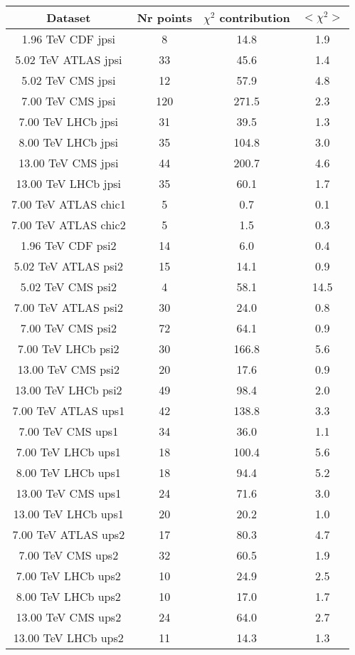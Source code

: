 \begin{table}[h!]
\centering
\begin{tabular}{c|c|c|c}
Dataset & Nr points & $\chi^2$ contribution & $<\chi^2>$ \\
\hline
1.96 TeV CDF jpsi & 8 & 14.8 & 1.9 \\
5.02 TeV ATLAS jpsi & 33 & 45.6 & 1.4 \\
5.02 TeV CMS jpsi & 12 & 57.9 & 4.8 \\
7.00 TeV CMS jpsi & 120 & 271.5 & 2.3 \\
7.00 TeV LHCb jpsi & 31 & 39.5 & 1.3 \\
8.00 TeV LHCb jpsi & 35 & 104.8 & 3.0 \\
13.00 TeV CMS jpsi & 44 & 200.7 & 4.6 \\
13.00 TeV LHCb jpsi & 35 & 60.1 & 1.7 \\
7.00 TeV ATLAS chic1 & 5 & 0.7 & 0.1 \\
7.00 TeV ATLAS chic2 & 5 & 1.5 & 0.3 \\
1.96 TeV CDF psi2 & 14 & 6.0 & 0.4 \\
5.02 TeV ATLAS psi2 & 15 & 14.1 & 0.9 \\
5.02 TeV CMS psi2 & 4 & 58.1 & 14.5 \\
7.00 TeV ATLAS psi2 & 30 & 24.0 & 0.8 \\
7.00 TeV CMS psi2 & 72 & 64.1 & 0.9 \\
7.00 TeV LHCb psi2 & 30 & 166.8 & 5.6 \\
13.00 TeV CMS psi2 & 20 & 17.6 & 0.9 \\
13.00 TeV LHCb psi2 & 49 & 98.4 & 2.0 \\
7.00 TeV ATLAS ups1 & 42 & 138.8 & 3.3 \\
7.00 TeV CMS ups1 & 34 & 36.0 & 1.1 \\
7.00 TeV LHCb ups1 & 18 & 100.4 & 5.6 \\
8.00 TeV LHCb ups1 & 18 & 94.4 & 5.2 \\
13.00 TeV CMS ups1 & 24 & 71.6 & 3.0 \\
13.00 TeV LHCb ups1 & 20 & 20.2 & 1.0 \\
7.00 TeV ATLAS ups2 & 17 & 80.3 & 4.7 \\
7.00 TeV CMS ups2 & 32 & 60.5 & 1.9 \\
7.00 TeV LHCb ups2 & 10 & 24.9 & 2.5 \\
8.00 TeV LHCb ups2 & 10 & 17.0 & 1.7 \\
13.00 TeV CMS ups2 & 24 & 64.0 & 2.7 \\
13.00 TeV LHCb ups2 & 11 & 14.3 & 1.3 \\

\end{tabular}
\end{table}
